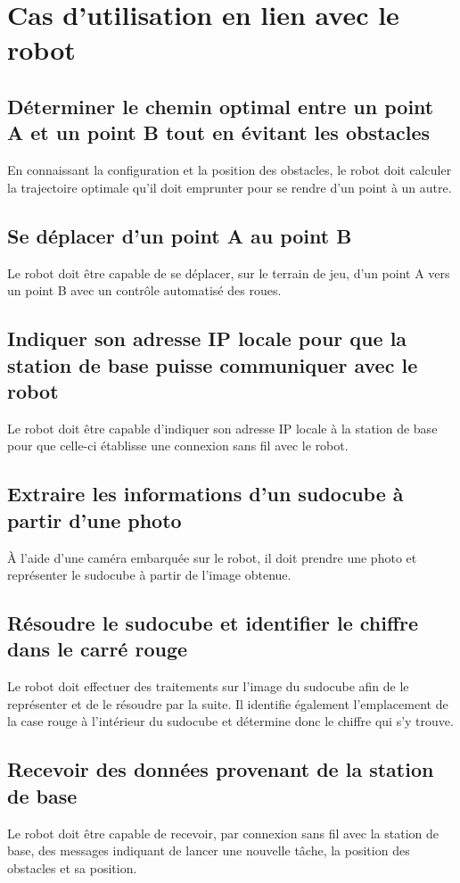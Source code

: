 \section{Cas d'utilisation en lien avec le robot}
\subsection{Déterminer le chemin optimal entre un point A et un point B tout en évitant les obstacles}
En connaissant la configuration et la position des obstacles, le robot doit calculer la trajectoire optimale qu'il doit emprunter pour se rendre d'un point à un autre.
\subsection{Se déplacer d'un point A au point B}
Le robot doit être capable de se déplacer, sur le terrain de jeu, d'un point A vers un point B avec un contrôle automatisé des roues.
\subsection{Indiquer son adresse IP locale pour que la station de base puisse communiquer avec le robot}
Le robot doit être capable d'indiquer son adresse IP locale à la station de base pour que celle-ci établisse une connexion sans fil avec le robot.
\subsection{Extraire les informations d'un sudocube à partir d'une photo}
À l'aide d'une caméra embarquée sur le robot, il doit prendre une photo et représenter le sudocube à partir de l'image obtenue.
\subsection{Résoudre le sudocube et identifier le chiffre dans le carré rouge}
Le robot doit effectuer des traitements sur l'image du sudocube afin de le représenter et de le résoudre par la suite. Il identifie également l'emplacement de la case rouge à l'intérieur du sudocube et détermine donc le chiffre qui s'y trouve.
\subsection{Recevoir des données provenant de la station de base}
Le robot doit être capable de recevoir, par connexion sans fil avec la station de base, des messages indiquant de lancer une nouvelle tâche, la position des obstacles et sa position.

